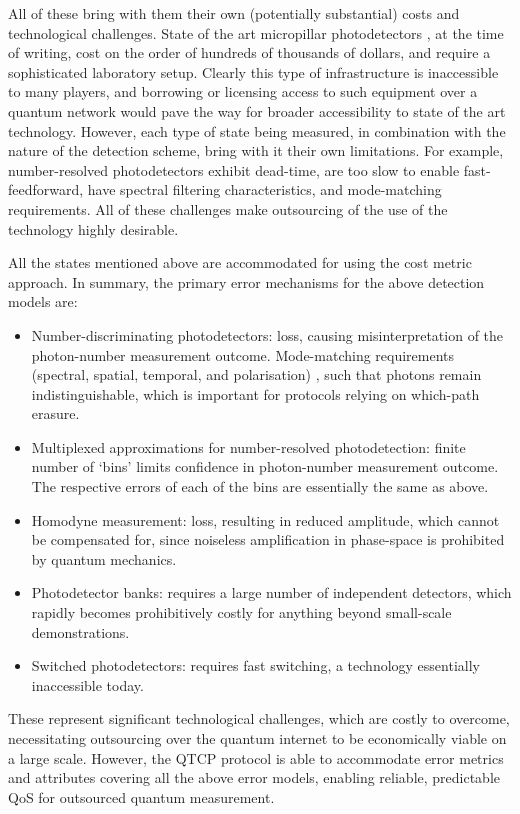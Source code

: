 \documentclass[aps,rmp,twocolumn,amsmath,amssymb,nofootinbib,superscriptaddress]{revtex4}
\begin{document}
All of these bring with them their own (potentially substantial) costs and technological challenges. State of the art micropillar photodetectors \cite{???}, at the time of writing, cost on the order of hundreds of thousands of dollars, and require a sophisticated laboratory setup. Clearly this type of infrastructure is inaccessible to many players, and borrowing or licensing access to such equipment over a quantum network would pave the way for broader accessibility to state of the art technology. However, each type of state being measured, in combination with the nature of the detection scheme, bring with it their own limitations. For example, number-resolved photodetectors exhibit dead-time, are too slow to enable fast-feedforward, have spectral filtering characteristics, and mode-matching requirements. All of these challenges make outsourcing of the use of the technology highly desirable.

All the states mentioned above are accommodated for using the cost metric approach. In summary, the primary error mechanisms for the above detection models are:
\begin{itemize}
    \item Number-discriminating photodetectors: loss, causing misinterpretation of the photon-number measurement outcome. Mode-matching requirements (spectral, spatial, temporal, and polarisation) \cite{bib:RohdeModPhotoDet06}, such that photons remain indistinguishable, which is important for protocols relying on which-path erasure.
    \item Multiplexed approximations for number-resolved photodetection: finite number of `bins' limits confidence in photon-number measurement outcome. The respective errors of each of the bins are essentially the same as above.
    \item Homodyne measurement: loss, resulting in reduced amplitude, which cannot be compensated for, since noiseless amplification in phase-space is prohibited by quantum mechanics.
    \item Photodetector banks: requires a large number of independent detectors, which rapidly becomes prohibitively costly for anything beyond small-scale demonstrations.
    \item Switched photodetectors: requires fast switching, a technology essentially inaccessible today.
\end{itemize}

These represent significant technological challenges, which are costly to overcome, necessitating outsourcing over the quantum internet to be economically viable on a large scale. However, the QTCP protocol is able to accommodate error metrics and attributes covering all the above error models, enabling reliable, predictable QoS for outsourced quantum measurement.
\end{document}
